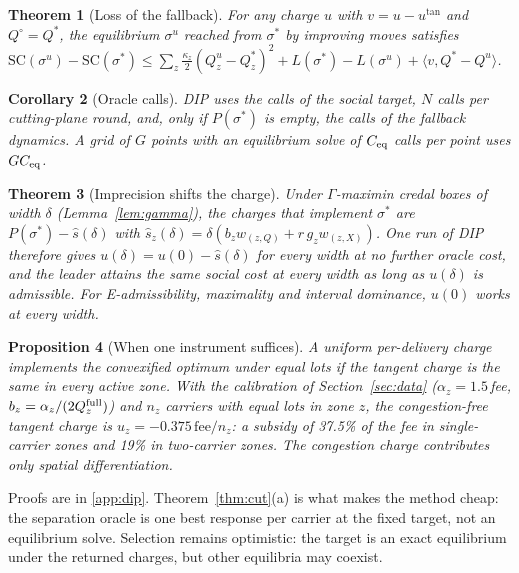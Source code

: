 \documentclass[preprint,12pt]{elsarticle}
\newtheorem{theorem}{Theorem}
\newtheorem{proposition}[theorem]{Proposition}
\newtheorem{corollary}[theorem]{Corollary}
\theoremstyle{definition}
\theoremstyle{remark}
\newcommand{\ip}[2]{\langle #1,#2\rangle}
\begin{document}
\begin{theorem}[Loss of the fallback]\label{thm:fallback}
For any charge $u$ with $v=u-u^{\tan}$ and $Q^\circ=Q^*$, the equilibrium $\sigma^u$ reached from $\sigma^*$ by improving moves satisfies $\mathrm{SC}(\sigma^u)-\mathrm{SC}(\sigma^*)\le\sum_z\tfrac{\kappa_z}{2}(Q^u_z-Q^*_z)^2+L(\sigma^*)-L(\sigma^u)+\ip{v}{Q^*-Q^u}$.
\end{theorem}

\begin{corollary}[Oracle calls]\label{cor:calls}
DIP uses the calls of the social target, $N$ calls per cutting-plane round, and, only if $P(\sigma^*)$ is empty, the calls of the fallback dynamics. A grid of $G$ points with an equilibrium solve of $C_{\rm eq}$ calls per point uses $GC_{\rm eq}$.
\end{corollary}

\begin{theorem}[Imprecision shifts the charge]\label{thm:credal}
Under $\Gamma$-maximin credal boxes of width $\delta$ (Lemma~\ref{lem:gamma}), the charges that implement $\sigma^*$ are $P(\sigma^*)-\hat s(\delta)$ with $\hat s_z(\delta)=\delta(b_zw_{(z,Q)}+r\,g_zw_{(z,X)})$. One run of DIP therefore gives $u(\delta)=u(0)-\hat s(\delta)$ for every width at no further oracle cost, and the leader attains the same social cost at every width as long as $u(\delta)$ is admissible. For E-admissibility, maximality and interval dominance, $u(0)$ works at every width.
\end{theorem}

\begin{proposition}[When one instrument suffices]\label{prop:uniform}
A uniform per-delivery charge implements the convexified optimum under equal lots if the tangent charge is the same in every active zone. With the calibration of Section~\ref{sec:data} ($\alpha_z=1.5\,$fee, $b_z=\alpha_z/(2Q^{\rm full}_z)$) and $n_z$ carriers with equal lots in zone $z$, the congestion-free tangent charge is $u_z=-0.375\,\mathrm{fee}/n_z$: a subsidy of 37.5\% of the fee in single-carrier zones and 19\% in two-carrier zones. The congestion charge contributes only spatial differentiation.
\end{proposition}

Proofs are in \ref{app:dip}. Theorem~\ref{thm:cut}(a) is what makes the method cheap: the separation oracle is one best response per carrier at the fixed target, not an equilibrium solve. Selection remains optimistic: the target is an exact equilibrium under the returned charges, but other equilibria may coexist.
\end{document}
